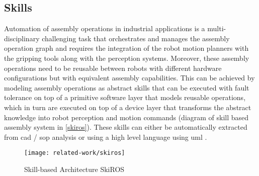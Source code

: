 

\subsection{Skills}

Automation of assembly operations in industrial applications \cite{Patel2012} is a multi-disciplinary challenging task that orchestrates and manages the assembly operation graph and requires the integration of the robot motion planners with the gripping tools \cite{Thomas2015} along with the perception systems. Moreover, these assembly operations need to be reusable \cite{Butting2016,Andersen2014} between robots with different hardware configurations but with equivalent assembly capabilities. This can be achieved by modeling assembly operations as abstract skills \cite{Holz2015} that can be executed with fault tolerance \cite{ThomasICRA2003} on top of a primitive software layer that models reusable operations, which in turn are executed on top of a device layer that transforms the abstract knowledge into robot perception and motion commands (diagram of skill based assembly system in \cref{skiros}). These skills can either be automatically extracted from \gls{cad} / \gls{sop} analysis \cite{Thomas2001} or using a high level language using \gls{uml} \cite{ThomasICRA2013}.

\begin{figure}[H]
	\centering
	\texttt{[image: related-work/skiros]}
	\caption[Skill-based Architecture SkiROS]{Skill-based Architecture SkiROS \cite{Holz2015}}
	\label{fig:skiros}
\end{figure}

%


